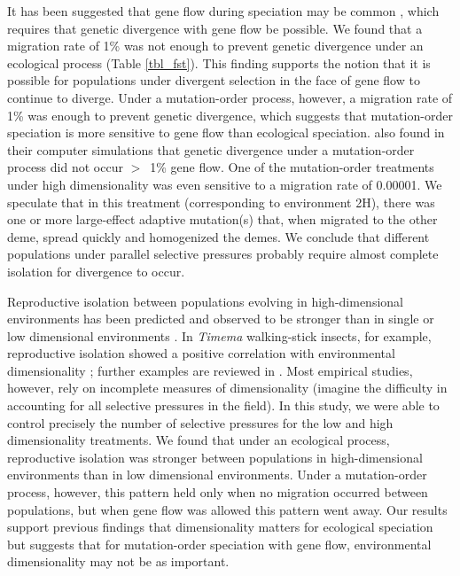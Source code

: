 \begin{doublespace}
It has been suggested that gene flow during speciation
may be common \citetext{\citealt{coy04}, p. 112; \citealt{nos08}},
which requires that genetic divergence with gene flow be possible.
%
We found that a migration rate of 1\% was not enough to prevent
genetic divergence under an ecological process (Table \ref{tbl_fst}).
%
This finding supports the notion that it is possible for populations
under divergent selection in the face of gene flow to continue to diverge.
%
Under a mutation-order process, however, a migration rate of 1\%
was enough to prevent genetic divergence,
which suggests that mutation-order speciation
is more sensitive to gene flow than ecological speciation.
%
\cite{nos11} also found in their computer simulations
that genetic divergence under a mutation-order process
did not occur $>$~1\% gene flow.
%
One of the mutation-order treatments under high dimensionality
was even sensitive to a migration rate of 0.00001.
%
We speculate that in this treatment (corresponding to environment 2H),
there was one or more large-effect adaptive mutation(s) that,
when migrated to the other deme, spread quickly and homogenized the demes.
%
We conclude that different populations under parallel selective pressures
probably require almost complete isolation for divergence to occur.



Reproductive isolation between populations evolving in high-dimensional
environments has been predicted and observed to be stronger than in single or
low dimensional environments \citep{ric93,nos09,nos09b}.
%
In \emph{Timema} walking-stick insects, for example, reproductive isolation
showed a positive correlation with environmental dimensionality
\citep{nos08b,nos09b}; further examples are reviewed in \citet{nos09}.
%
Most empirical studies, however, rely on incomplete measures of dimensionality
(imagine the difficulty in accounting for all selective pressures in the field).
%
In this study, we were able to control precisely the number of selective
pressures for the low and high dimensionality treatments.
%
We found that under an ecological process, reproductive isolation was stronger
between populations in high-dimensional environments than in low dimensional
environments.
%
Under a mutation-order process, however, this pattern held only when no
migration occurred between populations, but when gene flow was allowed this
pattern went away.
%
Our results support previous findings that dimensionality matters for
ecological speciation but suggests that for mutation-order speciation with gene
flow, environmental dimensionality may not be as important.




\end{doublespace}
